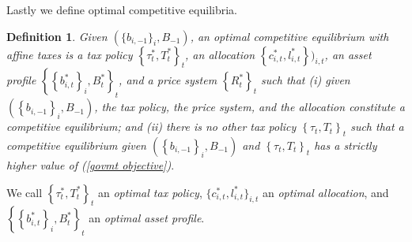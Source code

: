 \documentclass[thmsb,11pt]{article}
\newtheorem{definition}{Definition}
\begin{document}


\smallskip Lastly we define optimal competitive equilibria.

\begin{definition}
\label{Def: optimal CE affine} Given $(\{b_{i,-1}\}_{i},B_{-1})$, an
optimal competitive equilibrium with affine taxes is a tax
policy $\left\{ \tau _{t}^{\ast },T_{t}^{\ast }\right\} _{t}$, an allocation
$ \left\{ c_{i,t}^{\ast },l_{i,t}^{\ast } \right\})_{i,t}$, an asset profile
$\left\{\left\{b_{i,t}^{\ast }\right\}
_{i},B_{t}^{\ast }\right\} _{t}$, and a price system $\left\{ R_{t}^{\ast
}\right\} _{t}$ such that (i) given $\left( \left\{ b_{i,-1}\right\}
_{i},B_{-1}\right) $, the tax policy,  %
 the price system, %
and the allocation %
constitute a competitive equilibrium; and (ii) there is no other tax policy $%
\left\{ \tau _{t},T_{t}\right\} _{t}$ such that a competitive equilibrium
given $\left( \left\{ b_{i,-1}\right\} _{i},B_{-1}\right) $ and $\left\{
\tau _{t},T_{t}\right\} _{t}$ has a strictly higher value of (\ref{govmt
objective})$.$
\end{definition}

\smallskip We  call $\left \{ \tau _{t}^{\ast },T_{t}^{\ast }\right \}
_{t}$ an \textit{optimal tax policy}, $\{c_{i,t}^{\ast },l_{i,t}^{\ast
}\}_{i,t}$ an \textit{optimal allocation}, and $\left \{ \left \{
b_{i,t}^{\ast }\right \} _{i},B_{t}^{\ast }\right \} _{t}$ an \textit{%
optimal asset profile}.
\end{document}
